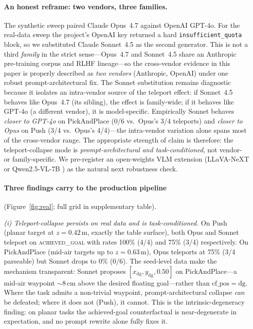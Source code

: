 \documentclass{article}
\begin{document}
\paragraph{An honest reframe: two vendors, three families.}
The synthetic sweep paired Claude Opus~4.7 against OpenAI GPT-4o. For the
real-data sweep the project's OpenAI key returned a hard
\texttt{insufficient\_quota} block, so we substituted Claude
Sonnet~4.5 as the second generator. This is not a third \emph{family} in the
strict sense---Opus~4.7 and Sonnet~4.5 share an Anthropic pre-training corpus
and RLHF lineage---so the cross-vendor evidence in this paper is properly
described as \emph{two vendors} (Anthropic, OpenAI) under one robust
prompt-architectural fix. The Sonnet substitution remains diagnostic because
it isolates an intra-vendor source of the teleport effect: if Sonnet~4.5
behaves like Opus~4.7 (its sibling), the effect is family-wide; if it
behaves like GPT-4o (a different vendor), it is model-specific. Empirically
Sonnet behaves \emph{closer to GPT-4o} on PickAndPlace (0/6 vs.\ Opus's 3/4
teleports) and \emph{closer to Opus} on Push (3/4 vs.\ Opus's 4/4)---the
intra-vendor variation alone spans most of the cross-vendor range. The
appropriate strength of claim is therefore: the teleport-collapse mode
is \emph{prompt-architectural and task-conditioned}, not vendor- or
family-specific. We pre-register an open-weights VLM extension (LLaVA-NeXT
or Qwen2.5-VL-7B \citep{chen2024promptable}) as the natural next robustness
check.

\paragraph{Three findings carry to the production pipeline} (Figure~\ref{fig:real};
full grid in supplementary table).

\emph{(i) Teleport-collapse persists on real data and is task-conditioned.}
On Push (planar target at $z\!=\!0.42$\,m, exactly the table surface), both
Opus and Sonnet teleport on \textsc{achieved\_goal} with rates 100\% (4/4)
and 75\% (3/4) respectively. On PickAndPlace (mid-air targets up to $z=0.63$\,m),
Opus teleports at 75\% (3/4 parseable) but Sonnet drops to 0\% (0/6). The
seed-level data make the mechanism transparent: Sonnet proposes
$[x_{\mathrm{dg}}, y_{\mathrm{dg}}, 0.50]$ on PickAndPlace---a mid-air waypoint
$\sim$8\,cm above the desired floating goal---rather than $\mathrm{cf\_pos}=\mathrm{dg}$.
Where the task admits a non-trivial waypoint, prompt-architectural collapse
\emph{can} be defeated; where it does not (Push), it cannot. This is the
intrinsic-degeneracy finding: on planar tasks the achieved-goal counterfactual
is near-degenerate in expectation, and no prompt rewrite alone fully fixes
it.
\end{document}
